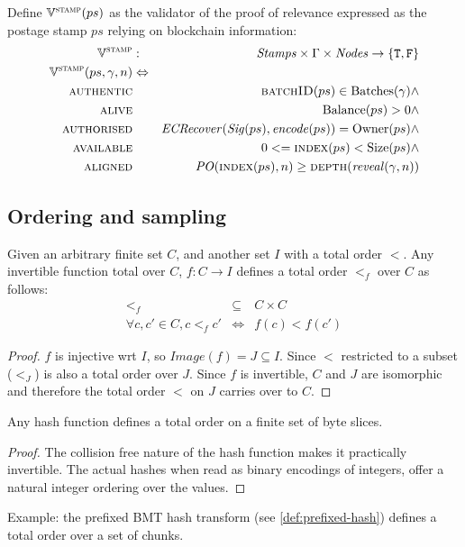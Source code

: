 \begin{definition}
\label{def:postage-stamp-validity}
Define $\mathbb{V}^{\textsc{stamp}}(ps)$ as the validator of the proof of relevance expressed as the postage stamp $ps$ relying on blockchain information:
%
\begin{eqnarray}
\mathbb{V}^{\textsc{stamp}}&:& \mathit{Stamps} \times\Gamma\times\mathit{Nodes}\to \{\mathtt{T,F}\}\\
\mathbb{V}^{\textsc{stamp}}(ps,\gamma,n) &\Leftrightarrow& \\
\textsc{authentic} & & \textsc{batchID}(ps)\in\mathrm{Batches}(\gamma)\wedge
\\
\textsc{alive} & & \mathrm{Balance}(ps) > 0 \wedge 
\\
\textsc{authorised} & &  \mathit{ECRecover}(\mathit{Sig}(ps), \mathit{encode}(ps)) = \mathrm{Owner}(ps) \wedge
\\
\textsc{available} & & 0 <= \textsc{index}(ps) < \mathrm{Size}(ps)\wedge
\\
\textsc{aligned} & & \mathit{PO}(\textsc{index}(ps),n) \geq \textsc{depth}(\mathit{reveal}(\gamma, n))
\end{eqnarray}
\end{definition}

\subsection{Ordering and sampling}


\begin{lemma}
\label{lem:ordering}
Given an arbitrary finite set $C$, and another set $I$ with a total order $<$.
Any invertible function total over $C$, $f: C\to I$ defines a total order $<_f$ over $C$ as follows:
%
\begin{eqnarray}
<_f&\subseteq&C\times C\\
\forall c,c'\in C, c<_f c'&\Leftrightarrow& f(c)<f(c')
\end{eqnarray}

\begin{proof}
$f$ is injective wrt $I$, so $\mathit{Image}(f)=J\subseteq I$. Since $<$ restricted to a subset ($<_J$) is also a total order over $J$.
Since $f$ is invertible, $C$ and $J$ are isomorphic and therefore the total order $<$ on $J$ carries over to $C$. \qedsymbol
\end{proof}
\end{lemma}

\begin{corollary}
Any hash function defines a total order on a finite set of byte slices.
%
\begin{proof}
The collision free nature of the hash function makes it practically invertible. The actual hashes when read as binary encodings of integers, offer a natural integer ordering over the values. 
\end{proof}

Example: the prefixed BMT hash transform (see \ref{def:prefixed-hash}) defines a total order over a set of chunks.
\end{corollary}

